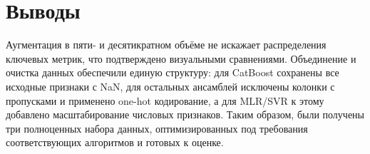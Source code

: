 \section{Выводы}

Аугментация в пяти- и десятикратном объёме не искажает распределения ключевых метрик, что подтверждено визуальными сравнениями. Объединение и очистка данных обеспечили единую структуру: для CatBoost сохранены все исходные признаки с NaN, для остальных ансамблей исключены колонки с пропусками и применено one-hot кодирование, а для MLR/SVR к этому добавлено масштабирование числовых признаков. Таким образом, были получены три полноценных набора данных, оптимизированных под требования соответствующих алгоритмов и готовых к оценке.